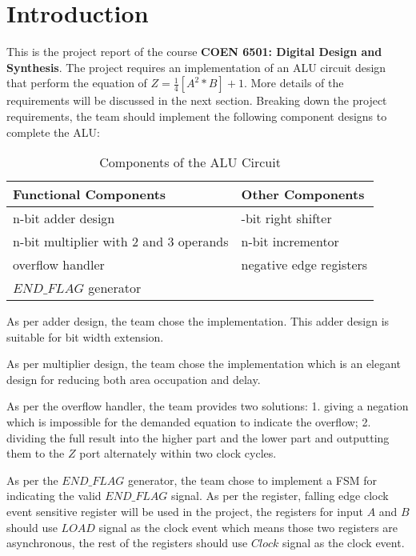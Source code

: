\section{Introduction}

This is the project report of the course \textbf{COEN 6501: Digital Design and Synthesis}.
The project requires an implementation of an ALU circuit design that perform the equation of \textbf{\(Z = \frac{1}{4} [A^2\ast B] + 1\)}.
More details of the requirements will be discussed in the next section.
Breaking down the project requirements, the team should implement the following component designs to complete the ALU:

\begin{table}[!ht]
	\renewcommand{\arraystretch}{1.3}
	\caption{Components of the ALU Circuit}
	\centering
	\begin{tabular}{ >{\centering\arraybackslash}p{7cm} >{\centering\arraybackslash}p{7cm} }
		\hline
		\bfseries Functional Components        & \bfseries Other Components \\
		\hline
		n-bit adder design                     & 2-bit right shifter        \\
		n-bit multiplier with 2 and 3 operands & n-bit incrementor          \\
		overflow handler                       & negative edge registers    \\
		\(END\_FLAG\) generator                &                            \\
		\hline
	\end{tabular}
	\label{tb:cac}
\end{table}

As per adder design, the team chose the \textbf{} implementation.
This adder design is suitable for bit width extension.

As per multiplier design, the team chose the \textbf{} implementation
which is an elegant design for reducing both area occupation and delay.

As per the overflow handler, the team provides two solutions:
1. giving a negation which is impossible for the demanded equation to indicate the overflow;
2. dividing the full result into the higher part and the lower part and outputting them to the \(Z\) port alternately within two clock cycles.

As per the \(END\_FLAG\) generator, the team chose to implement a FSM for indicating the valid \(END\_FLAG\) signal.
As per the register, falling edge clock event sensitive register will be used in the project,
the registers for input \(A\) and \(B\) should use \(LOAD\) signal as the clock event which means those two registers are asynchronous,
the rest of the registers should use \(Clock\) signal as the clock event.

